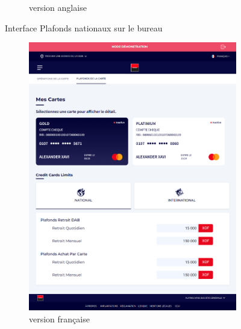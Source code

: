 \begin{figure}[!ht]
\begin{subfigure}[b]{0.49\textwidth}
        \caption{version anglaise}
    \end{subfigure}
       \caption{Interface Plafonds nationaux sur le bureau}
\end{figure}

\begin{figure}[!ht]
    \centering
    \begin{subfigure}[b]{0.49\textwidth}
        \centering
        \includegraphics[width=\textwidth]{images/screens/plafondsNat/tablette.png}
        \caption{version française}
    \end{subfigure}
    \hfill
    \begin{subfigure}[b]{0.49\textwidth}
        \centering

\end{subfigure}
\end{figure}
